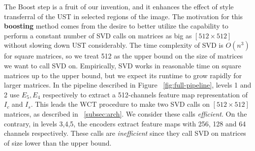 The Boost step is a fruit of our invention, and it enhances the effect of style transferral of the UST in selected regions of the image. The motivation for this \textbf{boosting} method comes from the desire to better utilize the capability to perform a constant number of SVD calls on matrices as big as $[512\times 512]$ without slowing down UST considerably. The time complexity of SVD is $O(n^3)$ for square matrices, so we treat 512 as the upper bound on the size of matrices we want to call SVD on. Empirically, SVD works in reasonable time on square matrices up to the upper bound, but we expect its runtime to grow rapidly for larger matrices. In the pipeline described in Figure ~\ref{fig:full-pipeline}, levels 1 and 2 use $E_5, E_4$ respectively to extract a 512-channels feature map representation of $I_c$ and $I_s$. This leads the WCT procedure to make two SVD calls on $[512\times 512]$ matrices, as described in ~\ref{subsec:arch}. We consider these calls \textit{efficient}. On the contrary, in levels 3,4,5, the encoders extract feature maps with 256, 128 and 64 channels respectively. These calls are \textit{inefficient} since they call SVD on matrices of size lower than the upper bound.\\


